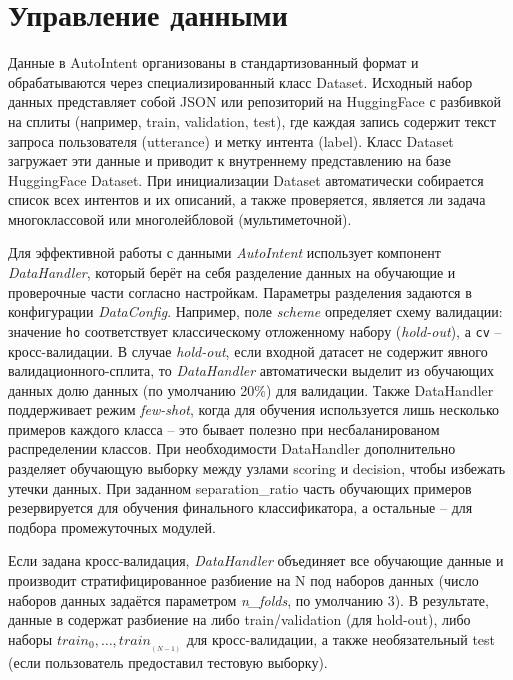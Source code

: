 \documentclass[14pt,a4paper,oneside,openany]{extbook}
\begin{document}
\section{Управление данными}
\label{sec:orgf4b1a33}
Данные в AutoIntent организованы в стандартизованный формат и обрабатываются через специализированный класс Dataset. Исходный набор данных представляет собой JSON или репозиторий на HuggingFace с разбивкой на сплиты (например, train, validation, test), где каждая запись содержит текст запроса пользователя (utterance) и метку интента (label). Класс Dataset загружает эти данные и приводит к внутреннему представлению на базе HuggingFace Dataset. При инициализации Dataset автоматически собирается список всех интентов и их описаний, а также проверяется, является ли задача многоклассовой или многолейбловой (мультиметочной).

Для эффективной работы с данными \emph{AutoIntent} использует компонент \emph{DataHandler}, который берёт на себя разделение данных на обучающие и проверочные части согласно настройкам. Параметры разделения задаются в конфигурации \emph{DataConfig}. Например, поле \emph{scheme} определяет схему валидации: значение \texttt{ho} соответствует классическому отложенному набору (\emph{hold-out}), а \texttt{cv} – кросс-валидации. В случае \emph{hold-out}, если входной датасет не содержит явного валидационного-сплита, то \emph{DataHandler} автоматически выделит из обучающих данных долю данных (по умолчанию 20\%) для валидации. Также DataHandler поддерживает режим \emph{few-shot}, когда для обучения используется лишь несколько примеров каждого класса – это бывает полезно при несбаланированом распределении классов. При необходимости DataHandler дополнительно разделяет обучающую выборку между узлами scoring и decision, чтобы избежать утечки данных. При заданном separation\_ratio часть обучающих примеров резервируется для обучения финального классификатора, а остальные – для подбора промежуточных модулей.

Если задана кросс-валидация, \emph{DataHandler} объединяет все обучающие данные и производит стратифицированное разбиение на N под наборов данных (число наборов данных задаётся параметром \emph{n\_folds}, по умолчанию 3). В результате, данные в содержат разбиение на либо train/validation (для hold-out), либо наборы \(train_0, \dots, train_{_(N-1)}\) для кросс-валидации, а также необязательный test (если пользователь предоставил тестовую выборку).
\end{document}
